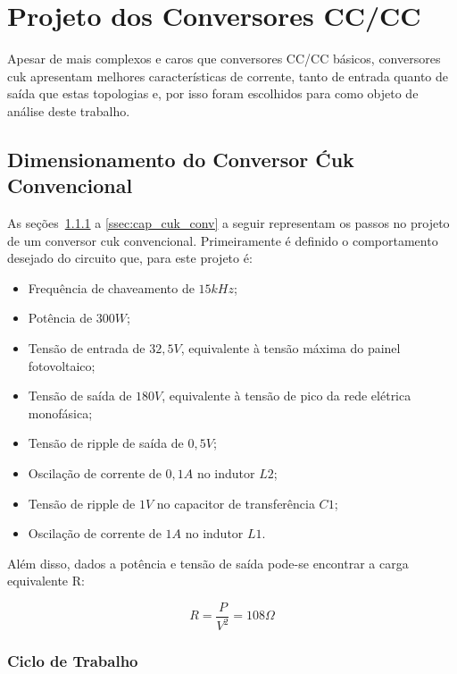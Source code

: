 \documentclass[
	12pt,				%
	openany,
	onseside,
	a4paper,			%
	english,			%
	french,				%
	spanish,			%
	brazil,				%
	]{abntex2}
\begin{document}
\section{Projeto dos Conversores CC/CC}

Apesar de mais complexos e caros que conversores CC/CC básicos, conversores cuk apresentam melhores características de corrente, tanto de entrada quanto de saída que estas topologias \cite{JOSEPH_2017_Intervealed_CUK} e, por isso foram escolhidos para como objeto de análise deste trabalho.

\subsection{Dimensionamento do Conversor Ćuk Convencional} \label{ssec:cuk_conv_met}

As seções~\ref{ssec:d_cuk_conv} a \ref{ssec:cap_cuk_conv} a seguir representam os passos no projeto de um conversor cuk convencional. Primeiramente é definido o comportamento desejado do circuito que, para este projeto é:

\begin{itemize}%
	\item Frequência de chaveamento de $15kHz$;
	\item Potência de $300W$;
	\item Tensão de entrada de $32,5V$, equivalente à tensão máxima do painel fotovoltaico;
	\item Tensão de saída de $180V$, equivalente à tensão de pico da rede elétrica monofásica;
	\item Tensão de ripple de saída de $0,5V$;
	\item Oscilação de corrente de $0,1A$ no indutor $L2$;
	\item Tensão de ripple de $1V$ no capacitor de transferência $C1$;
	\item Oscilação de corrente de $1A$ no indutor $L1$.
\end{itemize}

Além disso, dados a potência e tensão de saída pode-se encontrar a carga equivalente R:

\begin{equation}%
	R = \frac{P}{V^2} = 108 \Omega \label{eq:cuk_load}
\end{equation}

\subsubsection{Ciclo de Trabalho}\label{ssec:d_cuk_conv}
\end{document}
